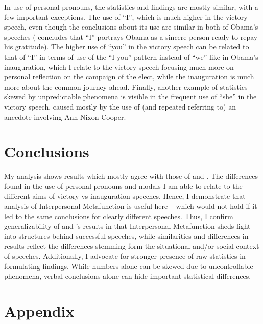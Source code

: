 \documentclass[11pt]{article}
\begin{document}
{	%
	In use of personal pronouns, the statistics and findings are mostly similar, with a few important exceptions. 
	The use of ``I'', which is much higher in the victory speech, even though the conclusions about its use are similar in both of Obama's speeches (\citeauthor{Ye} concludes that ``I'' portrays Obama as a sincere person ready to repay his gratitude).
	The higher use of ``you'' in the victory speech can be related to that of ``I'' in terms of use of the ``I-you'' pattern instead of ``we'' like in Obama's inauguration, which I relate to the victory speech focusing much more on personal reflection on the campaign of the elect, while the inauguration is much more about the common journey ahead.
	Finally, another example of statistics skewed by unpredictable phenomena is visible in the frequent use of ``she'' in the victory speech, caused mostly by the use of (and repeated referring to) an anecdote involving Ann Nixon Cooper.
}

\section{Conclusions}{
	My analysis shows results which mostly agree with those of \citeauthor{Ye} and \citeauthor{Nur}.
	The differences found in the use of personal pronouns and modals I am able to relate to the different aims of victory vs inauguration speeches. Hence, I demonstrate that analysis of Interpersonal Metafunction is useful here -- which would not hold if it led to the same conclusions for clearly different speeches.
	Thus, I confirm generalizability of \citeauthor{Ye} and \citeauthor{Nur}'s results in that Interpersonal Metafunction sheds light into structures behind successful speeches, while similarities and differences in results reflect the differences stemming form the situational and/or social context of speeches.
	Additionally, I advocate for stronger presence of raw statistics in formulating findings. While numbers alone can be skewed due to uncontrollable phenomena,  verbal conclusions alone can hide important statistical differences.
}




\section*{Appendix}{

}
\end{document}
